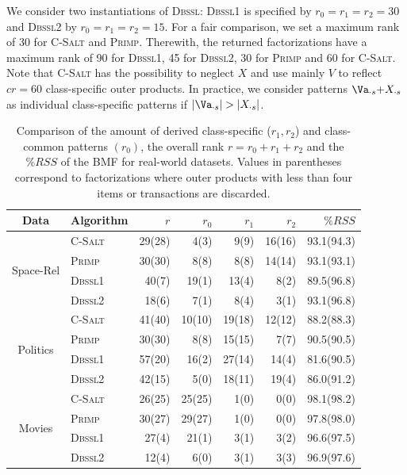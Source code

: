 We consider two instantiations of \textsc{Dbssl}: \textsc{Dbssl1} is specified by $r_0=r_1=r_2=30$ and \textsc{Dbssl2} by $r_0=r_1=r_2=15$. For a fair comparison, we set a maximum rank of 30 for \textsc{C-Salt} and \textsc{Primp}. Therewith, the returned factorizations have a maximum rank of 90 for \textsc{Dbssl1}, 45 for \textsc{Dbssl2}, 30 for \textsc{Primp} and 60 for \textsc{C-Salt}. Note that \textsc{C-Salt} has the possibility to neglect $X$ and use mainly $V$ to reflect $cr=60$ class-specific outer products. In practice, we consider patterns $\Va_{\cdot s}{+}X_{\cdot s}$ as individual class-specific patterns if $|\Va_{\cdot s}|>|X_{\cdot  s}|$.
\begin{table}%
	\centering
	\begin{tabular}{clrrrrr}\toprule
    Data & Algorithm & $r$ & $r_0$ & $r_1$ & $r_2$  & $\%RSS$  \\ \midrule
\multirow{4}{*}{Space-Rel} 
 & \textsc{C-Salt} & 29(28) & 4(3) & 9(9) & 16(16) & 93.1(94.3)\\
 & \textsc{Primp} & 30(30) & 8(8) & 8(8) & 14(14) & 93.1(93.1)\\
 & \textsc{Dbssl1} & 40(7) & 19(1) & 13(4) & 8(2) & 89.5(96.8)\\ 
 & \textsc{Dbssl2} & 18(6) & 7(1) & 8(4) & 3(1) & 93.1(96.8)\\
 \midrule
\multirow{4}{*}{Politics} 
 & \textsc{C-Salt} & 41(40) & 10(10) & 19(18) & 12(12) & 88.2(88.3)\\
 & \textsc{Primp} & 30(30) & 8(8) & 15(15) & 7(7) & 90.5(90.5)\\ 
 & \textsc{Dbssl1} & 57(20) & 16(2) & 27(14) & 14(4) & 81.6(90.5)\\
 & \textsc{Dbssl2} & 42(15) & 5(0) & 18(11) & 19(4) & 86.0(91.2)\\
 \midrule
\multirow{4}{*}{Movies}
 & \textsc{C-Salt} & 26(25) & 25(25) & 1(0) & 0(0) & 98.1(98.2)\\
 & \textsc{Primp} & 30(27) & 29(27) & 1(0) & 0(0) & 97.8(98.0)\\
 & \textsc{Dbssl1} & 27(4) & 21(1) & 3(1) & 3(2) & 96.6(97.5)\\
 & \textsc{Dbssl2} & 12(4) & 6(0) & 3(1) & 3(3) & 96.9(97.6)\\ 
 \bottomrule
    \end{tabular}
    \caption{Comparison of the amount of derived class-specific ($r_1,r_2$) and class-common patterns $(r_0)$, the overall rank $r=r_0+r_1+r_2$ and the $\%RSS$ of the BMF for real-world datasets. Values in parentheses correspond to factorizations where outer products with less than four items or transactions are discarded.}
  \label{tbl:CS:realWorld}
\end{table}

